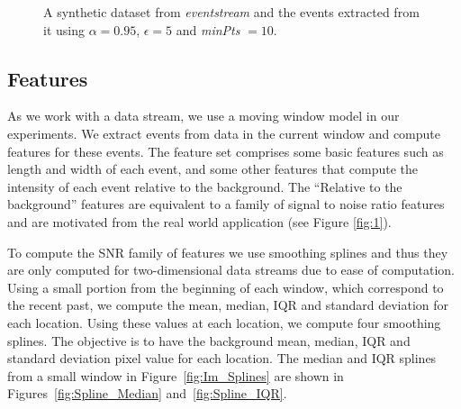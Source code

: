 \documentclass[a4paper,11pt]{article}
\begin{document}
\begin{figure}
	\centering
	\caption{A synthetic dataset from \textit{eventstream} and the events extracted from it using $\alpha=0.95$, $\epsilon = 5$ and {\it minPts} $= 10$.}
	\label{fig:blobs_A_B}
\end{figure}

\subsection{Features}\label{sec:Featurelist}

As we work with a data stream, we use a moving window model in our experiments. We extract events from data in the current window and compute features for these events. The feature set comprises some basic features such as length and width of each event, and some other features that compute the intensity of each event relative to the background. The  ``Relative to the background'' features are equivalent to a family of signal to noise ratio features and are motivated from the real world application (see Figure \ref{fig:1}).   
	 
To compute the SNR family of features  we use smoothing splines and thus they are only computed for two-dimensional data streams due to ease of computation.  Using a small portion from the beginning of each window, which correspond to the recent past, we compute the mean, median, IQR and standard deviation for each location. Using these values at each location, we compute four smoothing splines. The objective is to have the background mean, median, IQR and standard deviation pixel value for each location. The median and IQR splines from a small window in Figure~\ref{fig:Im_Splines} are shown in Figures~\ref{fig:Spline_Median} and~\ref{fig:Spline_IQR}. %
\end{document}
